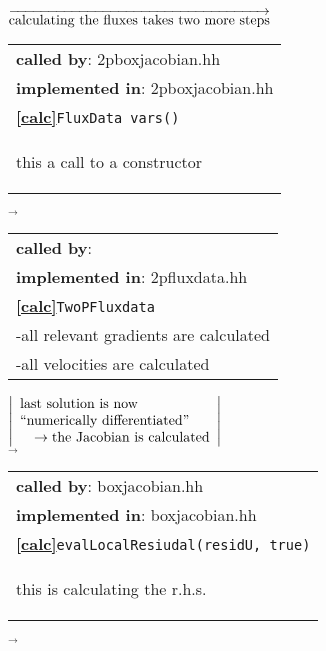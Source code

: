 \begin{landscape}
{\begin{minipage}{0.47\textwidth}
\end{minipage}
\nextline
{\scriptsize$\overrightarrow{
   \textnormal{calculating the fluxes takes two more steps} 
}$}
     \begin{tabular}{||l||}
      \hline\hline
	\textbf{called by}: 2pboxjacobian.hh\\
      \textbf{implemented in}: 2pboxjacobian.hh\\  
      \textbf{\textcircled{\ref{calc}}}\verb+FluxData vars()+ \\
    \begin{scriptsize}this a call to a constructor \end{scriptsize}\\\hline\hline
  \end{tabular}
    $\overrightarrow{
    }$
     \begin{tabular}{||l||}
      \hline\hline
	\textbf{called by}: \\
      \textbf{implemented in}: 2pfluxdata.hh\\  
      \textbf{\textcircled{\ref{calc}}}\verb+TwoPFluxdata+ \\
    \scriptsize{-all relevant gradients are calculated}\\
    \scriptsize{-all velocities are calculated}
    \\\hline\hline
  \end{tabular}
  \nextline
  $\left|
     \begin{array}{l}
    \textnormal{last solution is now}\\
    \textnormal{``numerically differentiated''}\\
    \quad \rightarrow \textnormal{the Jacobian is calculated}
  \end{array}
  \right |$\\
\nextline
    $\overrightarrow{
    }$
     \begin{tabular}{|l|}
      \hline
	\textbf{called by}: boxjacobian.hh\\
      \textbf{implemented in}: boxjacobian.hh \fbox{\fbox{$\rightarrow$flux}}\\  
      \textbf{\textcircled{\ref{calc}}}\verb+evalLocalResiudal(residU, true)+\\
    \begin{scriptsize}this is calculating the r.h.s.\end{scriptsize}\\\hline 
  \end{tabular}
    $\overrightarrow{
    }$
    \begin{tabular}{|l|}

\end{tabular}}
\end{landscape}
